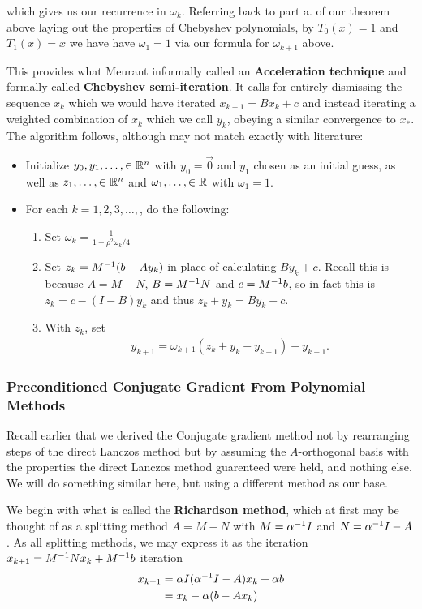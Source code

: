 \documentclass[11pt]{article}
\begin{document}
which gives us our recurrence in $\omega_k$. Referring back to part a. of our theorem above laying out the properties of Chebyshev polynomials, by $T_0(x) = 1$ and $T_1(x) = x$ we have have $\omega_1 = 1$ via our formula for $\omega_{k+1}$ above.

This provides what Meurant informally called an \textbf{Acceleration technique} and formally called \textbf{Chebyshev semi-iteration}. It calls for entirely dismissing the sequence $x_k$ which we would have iterated $x_{k+1} = Bx_k +c $ and instead iterating a weighted combination of $x_k$ which we call $y_k$, obeying a similar convergence to $x_*$. The algorithm follows, although may not match exactly with literature: \begin{itemize}
\item Initialize $y_0,y_1,\dots, \in \mathbb{R}^n$ with $y_0 = \vec 0 $ and $y_1$ chosen as an initial guess, as well as $z_1,\dots, \in \mathbb{R}^n$ and $\omega_1, \dots, \in \mathbb{R}$ with $\omega_1 = 1$.
\item For each $k = 1,2,3, \dots,$, do the following: \begin{enumerate}
\item Set $\omega_k = \frac{1}{1 - \rho^2 \omega_k / 4}$
\item Set $z_k = M^{-1} (b - A y_k)$ in place of calculating $By_k + c$. Recall this is because $A = M - N$, $B = M^{-1} N$ and $c = M^{-1} b$, so in fact this is $z_k = c - (I - B)y_k$ and thus $z_k + y_k  = B y_k + c$.
\item With $z_k$, set \begin{gather*}
y_{k+1} = \omega_{k+1} (z_k + y_k - y_{k-1}) + y_{k-1}.
\end{gather*}
\end{enumerate}
\end{itemize}

\subsubsection{Preconditioned Conjugate Gradient From Polynomial Methods}

Recall earlier that we derived the Conjugate gradient method not by rearranging steps of the direct Lanczos method but by assuming the $A$-orthogonal basis with the properties the direct Lanczos method guarenteed were held, and nothing else. We will do something similar here, but using a different method as our base.

We begin with what is called the \textbf{Richardson method}, which at first may be thought of as a splitting method $A = M - N$ with $M = \alpha^{-1} I$ and $N = \alpha^{-1} I - A$. As all splitting methods, we may express it as the iteration $x_{k+1} = M^{-1} N x_k + M^{-1} b$ iteration \begin{align*}
x_{k+1} &= \alpha I (\alpha^{-1} I - A) x_k + \alpha b \\
&= x_k - \alpha (b - Ax_k)
\end{align*}
\end{document}
